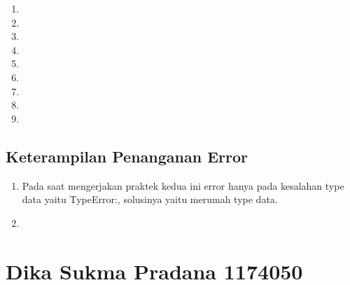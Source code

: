 \begin{enumerate}
\begin{enumerate}
    \item 
    
    \item 
    
    \item 
    
    \item 
    
    \item 
    
    \item 
    
    \item 
    
    \item 
    
    \item 
    
\end{enumerate}

\subsection{Keterampilan Penanganan Error}
\begin{enumerate}
    \item Pada saat mengerjakan praktek kedua ini error hanya pada kesalahan type data yaitu TypeError:, solusinya yaitu merumah type data.
    
    \item 
    
\end{enumerate}

\section{Dika Sukma Pradana 1174050}

\end{enumerate}
